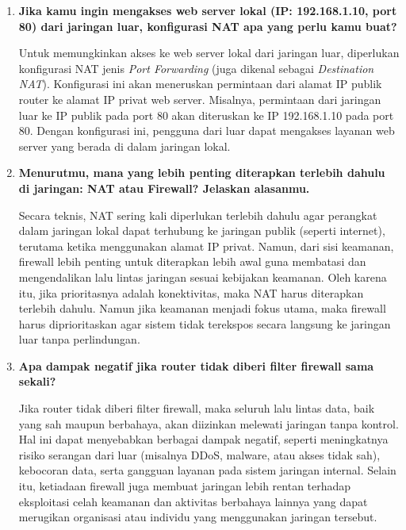 \begin{enumerate}
    \item \textbf{Jika kamu ingin mengakses web server lokal (IP: 192.168.1.10, port 80) dari jaringan luar, konfigurasi NAT apa yang perlu kamu buat?}
    
    Untuk memungkinkan akses ke web server lokal dari jaringan luar, diperlukan konfigurasi NAT jenis \textit{Port Forwarding} (juga dikenal sebagai \textit{Destination NAT}). Konfigurasi ini akan meneruskan permintaan dari alamat IP publik router ke alamat IP privat web server. Misalnya, permintaan dari jaringan luar ke IP publik pada port 80 akan diteruskan ke IP 192.168.1.10 pada port 80. Dengan konfigurasi ini, pengguna dari luar dapat mengakses layanan web server yang berada di dalam jaringan lokal.

    \item \textbf{Menurutmu, mana yang lebih penting diterapkan terlebih dahulu di jaringan: NAT atau Firewall? Jelaskan alasanmu.}
    
    Secara teknis, NAT sering kali diperlukan terlebih dahulu agar perangkat dalam jaringan lokal dapat terhubung ke jaringan publik (seperti internet), terutama ketika menggunakan alamat IP privat. Namun, dari sisi keamanan, firewall lebih penting untuk diterapkan lebih awal guna membatasi dan mengendalikan lalu lintas jaringan sesuai kebijakan keamanan. Oleh karena itu, jika prioritasnya adalah konektivitas, maka NAT harus diterapkan terlebih dahulu. Namun jika keamanan menjadi fokus utama, maka firewall harus diprioritaskan agar sistem tidak terekspos secara langsung ke jaringan luar tanpa perlindungan.

    \item \textbf{Apa dampak negatif jika router tidak diberi filter firewall sama sekali?}
    
    Jika router tidak diberi filter firewall, maka seluruh lalu lintas data, baik yang sah maupun berbahaya, akan diizinkan melewati jaringan tanpa kontrol. Hal ini dapat menyebabkan berbagai dampak negatif, seperti meningkatnya risiko serangan dari luar (misalnya DDoS, malware, atau akses tidak sah), kebocoran data, serta gangguan layanan pada sistem jaringan internal. Selain itu, ketiadaan firewall juga membuat jaringan lebih rentan terhadap eksploitasi celah keamanan dan aktivitas berbahaya lainnya yang dapat merugikan organisasi atau individu yang menggunakan jaringan tersebut.
\end{enumerate}

